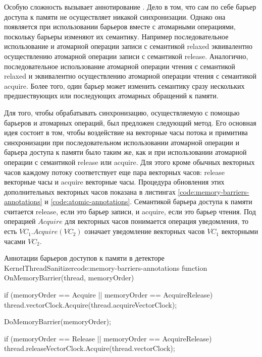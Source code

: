 Особую сложность вызывает аннотирование .
Дело в том, что сам по себе барьер доступа к памяти не осуществляет никакой синхронизации.
Однако она появляется при использовании барьеров вместе с атомарными операциями, поскольку барьеры изменяют их семантику.
Например последовательное использование  и атомарной операции записи с семантикой relaxed эквивалентно осуществлению атомарной операции записи с семантикой release.
Аналогично, последовательное использование атомарной операции чтения с семантикой relaxed и  эквивалентно осуществлению атомарной операции чтения с семантикой acquire.
Более того, один барьер может изменить семантику сразу нескольких предшествующих или последующих атомарных обращений к памяти.

Для того, чтобы обрабатывать синхронизацию, осуществляемую с помощью барьеров и атомарных операций, был предложен следующий метод.
Его основная идея состоит в том, чтобы воздействие на векторные часы потока и примитива синхронизации при последовательном использовании атомарной операции и барьера доступа к памяти было таким же, как и при использовании атомарной операции с семантикой release или acquire.
Для этого кроме обычных векторных часов каждому потоку соответствует еще пара векторных часов: release векторные часы и acquire векторные часы.
Процедура обновления этих дополнительных векторных часов показана в листингах \ref{code:memory-barriers-annotations} и \ref{code:atomic-annotations}.
Семантикой барьера доступа к памяти считается release, если это барьер записи, и acquire, если это барьер чтения.
Под операцией $Acquire$ для векторных часов понимается операция уведомления, то есть $VC_1.Acquire(VC_2)$ означает уведомление векторных часов $VC_1$ векторными часами $VC_2$.

\begin{listing}{Аннотации барьеров доступов к памяти в детекторе KernelThreadSanitizer}{code:memory-barriers-annotations}
function OnMemoryBarrier(thread, memoryOrder) {
  if (memoryOrder == Acquire || memoryOrder == AcquireRelease) {
    thread.vectorClock.Acquire(thread.acquireVectorClock);
  }

  DoMemoryBarrier(memoryOrder);

  if (memoryOrder == Release || memoryOrder == AcquireRelease) {
    thread.releaseVectorClock.Acquire(thread.vectorClock);
  }
}
\end{listing}

